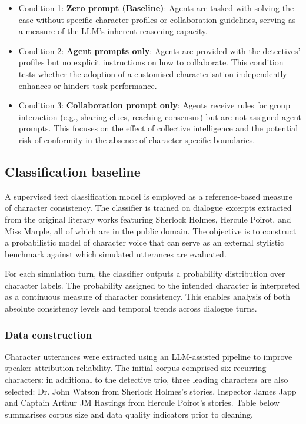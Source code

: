 \documentclass{article}
\begin{document}
\begin{itemize}
    \item Condition 1: \textbf{Zero prompt (Baseline)}: Agents are tasked with solving the case without specific character profiles or collaboration guidelines, serving as a measure of the LLM’s inherent reasoning capacity.
    \item Condition 2: \textbf{Agent prompts only}: Agents are provided with the detectives' profiles but no explicit instructions on how to collaborate. This condition tests whether the adoption of a customised characterisation independently enhances or hinders task performance.
    \item Condition 3: \textbf{Collaboration prompt only}: Agents receive rules for group interaction (e.g., sharing clues, reaching consensus) but are not assigned agent prompts. This focuses on the effect of collective intelligence and the potential risk of conformity in the absence of character-specific boundaries.
\end{itemize}

\subsection{Classification baseline}

A supervised text classification model is employed as a reference-based measure of character consistency. The classifier is trained on dialogue excerpts extracted from the original literary works featuring Sherlock Holmes, Hercule Poirot, and Miss Marple, all of which are in the public domain. The objective is to construct a probabilistic model of character voice that can serve as an external stylistic benchmark against which simulated utterances are evaluated.

For each simulation turn, the classifier outputs a probability distribution over character labels. The probability assigned to the intended character is interpreted as a continuous measure of character consistency. This enables analysis of both absolute consistency levels and temporal trends across dialogue turns.

\subsubsection{Data construction}

Character utterances were extracted using an LLM-assisted pipeline to improve speaker attribution reliability. The initial corpus comprised six recurring characters: in additional to the detective trio, three leading characters are also selected: Dr. John Watson from Sherlock Holmes's stories, Inspector James Japp and Captain Arthur JM Hastings from Hercule Poirot's stories. Table below summarises corpus size and data quality indicators prior to cleaning.
\end{document}
